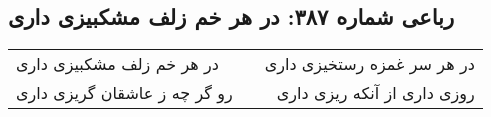 \begin{center}
\section*{رباعی شماره ۳۸۷: در هر خم زلف مشکبیزی داری}
\label{sec:sh387}
\begin{longtable}{l p{0.5cm} r}
در هر خم زلف مشکبیزی داری
&&
در هر سر غمزه رستخیزی داری
\\
رو گر چه ز عاشقان گریزی داری
&&
روزی داری از آنکه ریزی داری
\\
\end{longtable}
\end{center}
